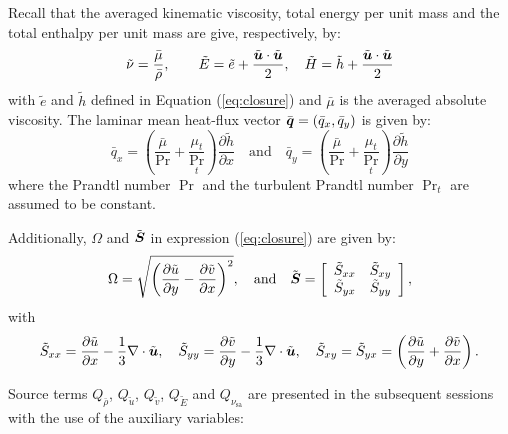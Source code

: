 \documentclass[10pt]{article}
\newcommand{\diff}[2] {\dfrac{\partial #1}{\partial #2}}
\newcommand{\bv}[1]{\ensuremath{\mbox{\boldmath$ #1 $}}}
\newcommand{\sa}{\nu_{\mathrm{sa}}}
\newcommand{\brho}{\bar{\rho}}
\newcommand{\tu}{\tilde{u}}
\newcommand{\tv}{\tilde{v}}
\newcommand{\tS}{\tilde{S}}
\newcommand{\tE}{\tilde{E}}
\newcommand{\bmu}{\bar{\mu}}
\begin{document}
Recall that the averaged kinematic viscosity, total energy per unit mass and the total enthalpy per unit mass are give, respectively, by:
\begin{equation}
 \begin{split}\label{eq:closure02}
  \tilde{\nu}=\dfrac{\bar{\mu}}{\bar{\rho}},\qquad \tilde{E}=\tilde{e}+\dfrac{\tilde{\bv{u}}\cdot \tilde{\bv{u}}}{2}, \quad \tilde{H}=\tilde{h}+\dfrac{\tilde{\bv{u}}\cdot \tilde{\bv{u}}}{2}
 \end{split}
\end{equation}
with $\tilde{e}$ and $\tilde{h}$ defined in Equation (\ref{eq:closure}) and $\bmu$ is the averaged absolute viscosity. The laminar mean heat-flux vector $\bar{\bv{q}}=(\bar{q}_x,\bar{q}_y)$ is given by:
%
\begin{equation}\label{eq:closure03}
 \bar{q}_x = \left(\dfrac{\bar{\mu}}{\Pr}+\dfrac{\mu_t}{\Pr_t}\right)\diff{\tilde{h}}{x}\quad \mbox{and} \quad \bar{q}_y = \left(\dfrac{\bar{\mu}}{\Pr}+\dfrac{\mu_t}{\Pr_t}\right)\diff{\tilde{h}}{y}
 \end{equation}
where the Prandtl number $\Pr$ and the turbulent Prandtl number $\Pr_t$ are assumed to be constant.


Additionally,   $\Omega$ and $\tilde{\bv{S}}$ in expression (\ref{eq:closure}) are given by:
\begin{equation*}
\label{eq:closure04}
 \Omega = \sqrt{\left( \diff{\tilde{u}}{y} - \diff{\tilde{v}}{x}\right)^2} ,\quad \mbox{and}\quad
\tilde{\bv{S}}=\left[
\begin{array}{cc}
\tS_{xx} & \tS_{xy}\\
\tS_{yx} & \tS_{yy}
\end{array}\right] , 
\end{equation*}
with
\begin{equation*}
\tS_{xx}= \diff{\tilde{u}}{x}-\dfrac{1}{3} \nabla \cdot \tilde{\bv{u}},\quad \tS_{yy}= \diff{\tilde{v}}{y}-\dfrac{1}{3} \nabla \cdot \tilde{\bv{u}}, \quad \tS_{xy}= \tS_{yx}= \left( \diff{\tilde{u}}{y} + \diff{\tilde{v}}{x}\right).\\
\end{equation*}



Source terms $Q_{\brho}$, $Q_{\tu}$, $Q_{\tv}$, $Q_{\tE}$ and $Q_{\sa}$ are presented in the subsequent sessions with the use of the auxiliary variables:
\end{document}
